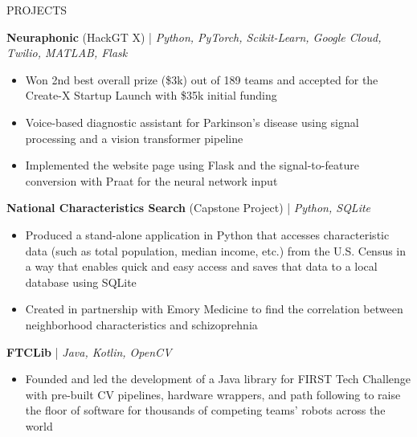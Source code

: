 \documentclass{resume} %
\begin{document}

\vspace{-0.8em}
\begin{rSection}{PROJECTS}
\vspace{-1.25em}
\item \textbf{Neuraphonic} (HackGT X) | \textit{Python, PyTorch, Scikit-Learn, Google Cloud, Twilio, MATLAB, Flask}
\vspace{-0.5em}
\begin{itemize}
   \itemsep -5pt {}
   \item Won 2nd best overall prize (\$3k) out of 189 teams and accepted for the Create-X Startup Launch with \$35k
   initial funding
   \item Voice-based diagnostic assistant for Parkinson's disease using signal processing and a vision transformer pipeline
   \item Implemented the website page using Flask and the signal-to-feature conversion with Praat for the neural network input
\end{itemize}
\vspace{-0.5em}
\item \textbf{National Characteristics Search} (Capstone Project) | \textit{Python, SQLite}
\vspace{-0.5em}
\begin{itemize}
   \itemsep -5pt {}
   \item Produced a stand-alone application in Python that accesses characteristic data (such as total population, median income, etc.)
   from the U.S. Census in a way that enables quick and easy access and saves that data to a local database using SQLite
   \item Created in partnership with Emory Medicine to find the correlation between neighborhood characteristics and schizoprehnia
\end{itemize}
\vspace{-0.5em}
\item \textbf{FTCLib} | \textit{Java, Kotlin, OpenCV}
\vspace{-0.5em}
\begin{itemize}
   \itemsep -5pt {}
   \item Founded and led the development of a Java library for FIRST Tech Challenge with pre-built CV pipelines, hardware wrappers, and path following
   to raise the floor of software for thousands of competing teams' robots across the world
\end{itemize}
\end{rSection}
\end{document}
